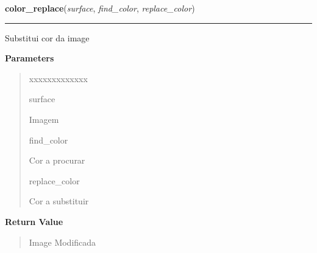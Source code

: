 \hspace{.8\funcindent}\begin{boxedminipage}{\funcwidth}

    \raggedright \textbf{color\_replace}(\textit{surface}, \textit{find\_color}, \textit{replace\_color})

    \vspace{-1.5ex}

    \rule{\textwidth}{0.5\fboxrule}
\setlength{\parskip}{2ex}
    Substitui cor da image

\setlength{\parskip}{1ex}
      \textbf{Parameters}
      \vspace{-1ex}

      \begin{quote}
        \begin{Ventry}{xxxxxxxxxxxxx}

          \item[surface]

          Imagem

          \item[find\_color]

          Cor a procurar

          \item[replace\_color]

          Cor a substituir

        \end{Ventry}

      \end{quote}

      \textbf{Return Value}
    \vspace{-1ex}

      \begin{quote}
      Image Modificada

      \end{quote}

    \end{boxedminipage}

    \label{color:Color:hex_to_rgb}

    \vspace{0.5ex}

